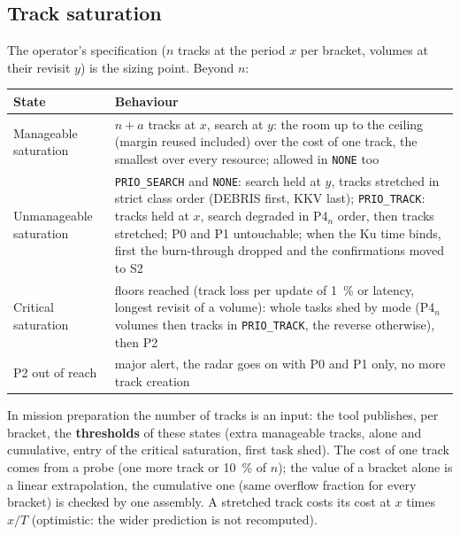 \documentclass[11pt,a4paper]{article}
\newcommand{\code}[1]{\texttt{\small #1}}
\begin{document}
\subsection{Track saturation}
The operator's specification ($n$ tracks at the period $x$ per bracket, volumes at their revisit $y$) is the sizing
point. Beyond $n$:
\begin{center}
{\small\begin{tabularx}{\linewidth}{@{}lL@{}}
\toprule
State & Behaviour\\
\midrule
Manageable saturation & $n+a$ tracks at $x$, search at $y$: the room up to the ceiling (margin reused included) over
the cost of one track, the smallest over every resource; allowed in \code{NONE} too\\
Unmanageable saturation & \code{PRIO\_SEARCH} and \code{NONE}: search held at $y$, tracks stretched in strict class order
(DEBRIS first, KKV last); \code{PRIO\_TRACK}: tracks held at $x$, search degraded in P4$_n$ order, then tracks
stretched; P0 and P1 untouchable; when the Ku time binds, first the burn-through dropped and the confirmations moved to
S2\\
Critical saturation & floors reached (track loss per update of \SI{1}{\percent} or latency, longest revisit of a volume):
whole tasks shed by mode (P4$_n$ volumes then tracks in \code{PRIO\_TRACK}, the reverse otherwise), then P2\\
P2 out of reach & major alert, the radar goes on with P0 and P1 only, no more track creation\\
\bottomrule
\end{tabularx}}
\end{center}
In mission preparation the number of tracks is an input: the tool publishes, per bracket, the \textbf{thresholds} of
these states (extra manageable tracks, alone and cumulative, entry of the critical saturation, first task shed). The
cost of one track comes from a probe (one more track or \SI{10}{\percent} of $n$); the value of a bracket alone is a
linear extrapolation, the cumulative one (same overflow fraction for every bracket) is checked by one assembly. A
stretched track costs its cost at $x$ times $x/T$ (optimistic: the wider prediction is not recomputed).
\end{document}
